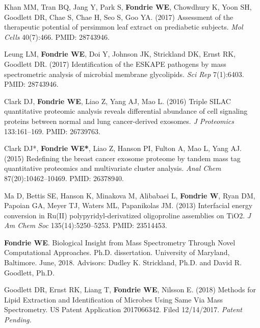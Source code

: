 \documentclass[11pt]{article}
\newcommand{\mysection}[1]{\vspace{1ex \textbf{\large \textrm{#1}} \quad
    \hrulefill}}
\begin{document}
\begin{etaremune}
  \item Khan MM, Tran BQ, Jang Y, Park S, \textbf{Fondrie WE}, Chowdhury K,
  Yoon SH, Goodlett DR, Chae S, Chae H, Seo S, Goo YA. (2017) Assessment of the
  therapeutic potential of persimmon leaf extract on prediabetic subjects. {\it
    Mol Cells} 40(7):466. PMID: 28743946.
    
  \item Leung LM, \textbf{Fondrie WE}, Doi Y, Johnson JK, Strickland DK, Ernst
  RK, Goodlett DR. (2017) Identification of the ESKAPE pathogens by mass
  spectrometric analysis of microbial membrane glycolipids. {\it Sci Rep}
  7(1):6403. PMID: 28743946.

  \item Clark DJ, \textbf{Fondrie WE}, Liao Z, Yang AJ, Mao L. (2016) Triple
  SILAC quantitative proteomic analysis reveals differential abundance of cell
  signaling proteins between normal and lung cancer-derived exosomes. {\it J
    Proteomics} 133:161--169. PMID: 26739763.

  \item Clark DJ*, \textbf{Fondrie WE*}, Liao Z, Hanson PI, Fulton A, Mao L,
  Yang AJ. (2015) Redefining the breast cancer exosome proteome by tandem mass
  tag quantitative proteomics and multivariate cluster analysis. \textit{Anal
    Chem} 87(20):10462--10469. PMID: 26378940.
    
  \item Ma D, Bettis SE, Hanson K, Minakova M, Alibabaei L, \textbf{Fondrie W},
  Ryan DM, Papoian GA, Meyer TJ, Waters ML, Papanikolas JM. (2013) Interfacial
  energy conversion in Ru(II) polypyridyl-derivatized oligoproline assemblies
  on TiO2. \textit{J Am Chem Soc} 135(14):5250--5253. PMID: 23514453.
\end{etaremune}

\mysection{Additional Publications}
\begin{etaremune}
  \item \textbf{Fondrie WE}. Biological Insight from Mass Spectrometry Through
  Novel Computational Approaches. Ph.D. dissertation. University of Maryland,
  Baltimore. June, 2018. Advisors: Dudley K. Strickland, Ph.D. and David R.
  Goodlett, Ph.D.
\end{etaremune}

\mysection{Patents}
\begin{etaremune}
  \item Goodlett DR, Ernst RK, Liang T, \textbf{Fondrie WE}, Nilsson E. (2018)
  Methods for Lipid Extraction and Identification of Microbes Using Same Via
  Mass Spectrometry. US Patent Application 2017066342. Filed 12/14/2017. {\it
    Patent Pending.}
\end{etaremune}
\end{document}
